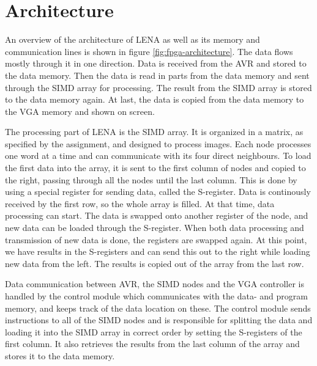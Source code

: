 \section{Architecture}




An overview of the architecture of LENA as well as its memory and communication
lines is shown in figure \ref{fig:fpga-architecture}. The data flows mostly
through it in one direction. Data is received from the AVR and stored to the
data memory. Then the data is read in parts from the data memory and sent
through the SIMD array for processing. The result from the SIMD array is stored
to the data memory again. At last, the data is copied from the data memory to
the VGA memory and shown on screen.


The processing part of LENA is the SIMD array. It is organized in a matrix,
as specified by the assignment, and designed to process images. Each node
processes one word at a time and can communicate with its four direct
neighbours. To load the first data into the array, it is sent to the
first column
of nodes and copied to the right, passing through all the nodes until the last
column. This is done by using a special register for sending data, called the
S-register. Data is continously received by the first row, so the whole array is
filled. At that time, data processing can start. The data is swapped onto
another register of the node, and new data can be loaded through the S-register.
When both data processing and transmission of new data is done, the registers
are swapped again. At this point, we have results in the S-registers and can
send this out to the right while loading new data from the left. The results is
copied out of the array from the last row.

Data communication between AVR, the SIMD nodes and the VGA controller is handled
by the control module which communicates with the data- and program memory, and
keeps track of the data location on these. The control module sends instructions
to all of the SIMD nodes and is responsible for splitting the data and loading
it into the SIMD array in correct order by setting the S-registers of the first
column. It also retrieves the results from the last column of the array and stores it
to the data memory.

